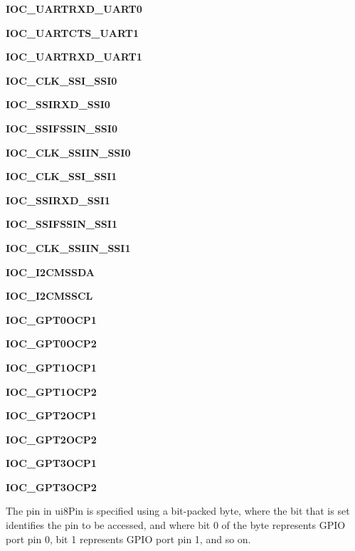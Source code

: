 \begin{DoxyItemize}
\item {\bfseries I\+O\+C\+\_\+\+U\+A\+R\+T\+R\+X\+D\+\_\+\+U\+A\+R\+T0} 
\item {\bfseries I\+O\+C\+\_\+\+U\+A\+R\+T\+C\+T\+S\+\_\+\+U\+A\+R\+T1} 
\item {\bfseries I\+O\+C\+\_\+\+U\+A\+R\+T\+R\+X\+D\+\_\+\+U\+A\+R\+T1} 
\item {\bfseries I\+O\+C\+\_\+\+C\+L\+K\+\_\+\+S\+S\+I\+\_\+\+S\+S\+I0} 
\item {\bfseries I\+O\+C\+\_\+\+S\+S\+I\+R\+X\+D\+\_\+\+S\+S\+I0} 
\item {\bfseries I\+O\+C\+\_\+\+S\+S\+I\+F\+S\+S\+I\+N\+\_\+\+S\+S\+I0} 
\item {\bfseries I\+O\+C\+\_\+\+C\+L\+K\+\_\+\+S\+S\+I\+I\+N\+\_\+\+S\+S\+I0} 
\item {\bfseries I\+O\+C\+\_\+\+C\+L\+K\+\_\+\+S\+S\+I\+\_\+\+S\+S\+I1} 
\item {\bfseries I\+O\+C\+\_\+\+S\+S\+I\+R\+X\+D\+\_\+\+S\+S\+I1} 
\item {\bfseries I\+O\+C\+\_\+\+S\+S\+I\+F\+S\+S\+I\+N\+\_\+\+S\+S\+I1} 
\item {\bfseries I\+O\+C\+\_\+\+C\+L\+K\+\_\+\+S\+S\+I\+I\+N\+\_\+\+S\+S\+I1} 
\item {\bfseries I\+O\+C\+\_\+\+I2\+C\+M\+S\+S\+DA} 
\item {\bfseries I\+O\+C\+\_\+\+I2\+C\+M\+S\+S\+CL} 
\item {\bfseries I\+O\+C\+\_\+\+G\+P\+T0\+O\+C\+P1} 
\item {\bfseries I\+O\+C\+\_\+\+G\+P\+T0\+O\+C\+P2} 
\item {\bfseries I\+O\+C\+\_\+\+G\+P\+T1\+O\+C\+P1} 
\item {\bfseries I\+O\+C\+\_\+\+G\+P\+T1\+O\+C\+P2} 
\item {\bfseries I\+O\+C\+\_\+\+G\+P\+T2\+O\+C\+P1} 
\item {\bfseries I\+O\+C\+\_\+\+G\+P\+T2\+O\+C\+P2} 
\item {\bfseries I\+O\+C\+\_\+\+G\+P\+T3\+O\+C\+P1} 
\item {\bfseries I\+O\+C\+\_\+\+G\+P\+T3\+O\+C\+P2} 
\end{DoxyItemize}

The pin in ui8\+Pin is specified using a bit-\/packed byte, where the bit that is set identifies the pin to be accessed, and where bit 0 of the byte represents G\+P\+IO port pin 0, bit 1 represents G\+P\+IO port pin 1, and so on.

